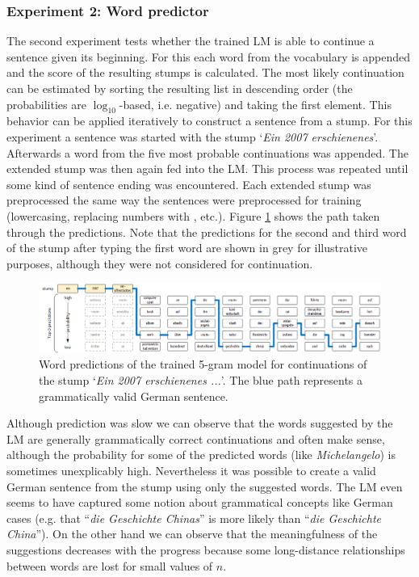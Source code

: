 \subsubsection{Experiment 2: Word predictor}

The second experiment tests whether the trained \ac{LM} is able to continue a sentence given its beginning. For this each word from the vocabulary is appended and the score of the resulting stumps is calculated. The most likely continuation can be estimated by sorting the resulting list in descending order (the probabilities are $\log_10$-based, i.e. negative) and taking the first element. This behavior can be applied iteratively to construct a sentence from a stump. For this experiment a sentence was started with the stump \foreignquote*{french}{\textit{Ein 2007 erschienenes}}. Afterwards a word from the five most probable continuations was appended. The extended stump was then again fed into the \ac{LM}. This process was repeated until some kind of sentence ending was encountered. Each extended stump was preprocessed the same way the sentences were preprocessed for training (lowercasing, replacing numbers with , etc.). Figure \ref{word_predictor} shows the path taken through the predictions. Note that the predictions for the second and third word of the stump after typing the first word are shown in grey for illustrative purposes, although they were not considered for continuation.

\begin{figure}[h!]
	\includegraphics[width=\linewidth]{./img/word_predictor.png}
	\caption{Word predictions of the trained 5-gram model for continuations of the stump \foreignquote*{french}{\textit{Ein 2007 erschienenes ...}}. The blue path represents a grammatically valid German sentence.}
	\label{word_predictor}
\end{figure}

Although prediction was slow we can observe that the words suggested by the \ac{LM} are generally grammatically correct continuations and often make sense, although the probability for some of the predicted words (like \textit{Michelangelo}) is sometimes unexplicably high. Nevertheless it was possible to create a valid German sentence from the stump using only the suggested words. The \ac{LM} even seems to have captured some notion about grammatical concepts like German cases (e.g. that \foreignquote{french}{\textit{die Geschichte Chinas}} is more likely than \foreignquote{french}{\textit{die Geschichte China}}). On the other hand we can observe that the meaningfulness of the suggestions decreases with the progress because some long-distance relationships between words are lost for small values of $n$.

